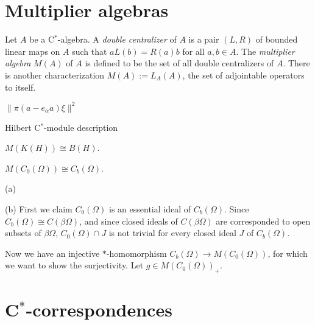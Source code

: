 \documentclass{../../large}
\begin{document}
\section{Multiplier algebras}
\begin{prb}
Let $A$ be a C$^*$-algebra.
A \emph{double centralizer} of $A$ is a pair $(L,R)$ of bounded linear maps on $A$ such that $aL(b)=R(a)b$ for all $a,b\in A$.
The \emph{multiplier algebra} $M(A)$ of $A$ is defined to be the set of all double centralizers of $A$.
There is another characterization $M(A):=L_A(A)$, the set of adjointable operators to itself.
\end{prb}
\begin{prb}
\end{prb}
\begin{prb}
\begin{parts}
\item $\|\pi(a-e_\alpha a)\xi\|^2$
\end{parts}
\end{prb}
\begin{prb}
\begin{parts}
\item Hilbert C$^*$-module description
\end{parts}
\end{prb}


\begin{prb}
\begin{parts}
\item $M(K(H))\cong B(H)$.
\item $M(C_0(\Omega))\cong C_b(\Omega)$.
\end{parts}
\end{prb}
\begin{pf}
(a)

(b)
First we claim $C_0(\Omega)$ is an essential ideal of $C_b(\Omega)$.
Since $C_b(\Omega)\cong C(\beta\Omega)$, and since closed ideals of $C(\beta\Omega)$ are corresponded to open subsets of $\beta\Omega$, $C_0(\Omega)\cap J$ is not trivial for every closed ideal $J$ of $C_b(\Omega)$.

Now we have an injective $*$-homomorphism $C_b(\Omega)\to M(C_0(\Omega))$, for which we want to show the surjectivity.
Let $g\in M(C_0(\Omega))_+$.
\end{pf}



\section{C$^*$-correspondences}
\end{document}
